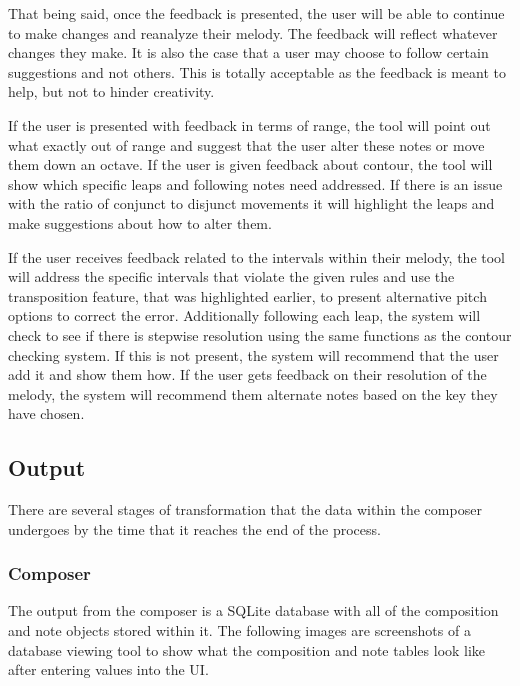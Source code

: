 \vspace{\baselineskip}

That being said, once the feedback is presented, the user will be able to continue to make changes and reanalyze their melody.  The feedback will reflect whatever changes they make.  It is also the case that a user may choose to follow certain suggestions and not others.  This is totally acceptable as the feedback is meant to help, but not to hinder creativity.

\vspace{\baselineskip}

If the user is presented with feedback in terms of range, the tool will point out what exactly out of range and suggest that the user alter these notes or move them down an octave.  If the user is given feedback about contour, the tool will show which specific leaps and following notes need addressed.  If there is an issue with the ratio of conjunct to disjunct movements it will highlight the leaps and make suggestions about how to alter them.

\vspace{\baselineskip}

If the user receives feedback related to the intervals within their melody, the tool will address the specific intervals that violate the given rules and use the transposition feature, that was highlighted earlier, to present alternative pitch options to correct the error.  Additionally following each leap, the system will check to see if there is stepwise resolution using the same functions as the contour checking system.  If this is not present, the system will recommend that the user add it and show them how.  If the user gets feedback on their resolution of the melody, the system will recommend them alternate notes based on the key they have chosen.

\subsection{Output}
\label{subsec:output}

There are several stages of transformation that the data within the composer undergoes by the time that it reaches the end of the process.

\subsubsection{Composer}
\label{subsubsec:composer}

The output from the composer is a SQLite database with all of the composition and note objects stored within it.  The following images are screenshots of a database viewing tool to show what the composition and note tables look like after entering values into the UI.

